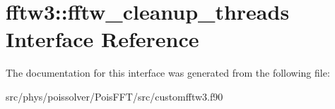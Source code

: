 \hypertarget{interfacefftw3_1_1fftw__cleanup__threads}{}\section{fftw3\+:\+:fftw\+\_\+cleanup\+\_\+threads Interface Reference}
\label{interfacefftw3_1_1fftw__cleanup__threads}


The documentation for this interface was generated from the following file\+:\begin{DoxyCompactItemize}
\item 
src/phys/poissolver/\+Pois\+F\+F\+T/src/customfftw3.\+f90\end{DoxyCompactItemize}
